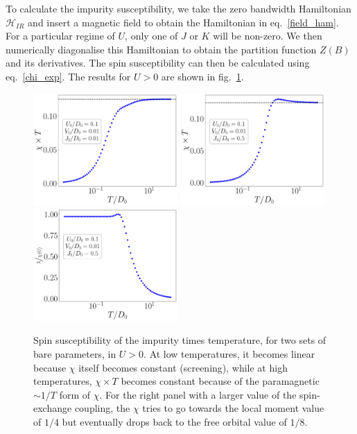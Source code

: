 \documentclass{report}
\numberwithin{equation}{section}
\begin{document}
To calculate the impurity susceptibility, we take the zero bandwidth Hamiltonian \(\mathcal{H}_{IR}\) and insert a magnetic field to obtain the Hamiltonian in eq.~\eqref{field_ham}. For a particular regime of \(U\), only one of \(J\) or \(K\) will be non-zero. We then numerically diagonalise this Hamiltonian to obtain the partition function \(Z(B)\) and its derivatives. The spin susceptibility can then be calculated using eq.~\eqref{chi_exp}. The results for \(U>0\) are shown in fig.~\ref{chi}.
\begin{figure}[htpb]
	\centering
	\includegraphics[width=0.49\textwidth]{../figures/chiT.pdf}
	\includegraphics[width=0.49\textwidth]{../figures/chiT_large.pdf}
	\includegraphics[width=0.49\textwidth]{../figures/chi.pdf}
	\caption{Spin susceptibility of the impurity times temperature, for two sets of bare parameters, in \(U>0\). At low temperatures, it becomes linear because \(\chi\) itself becomes constant (screening), while at high temperatures, \(\chi\times T\) becomes constant because of the paramagnetic \(\sim 1/T\) form of \(\chi\). For the right panel with a larger value of the spin-exchange coupling, the \(\chi\) tries to go towards the local moment value of \(1/4\) but eventually drops back to the free orbital value of \(1/8\).}
	\label{chi}
\end{figure}
\end{document}
